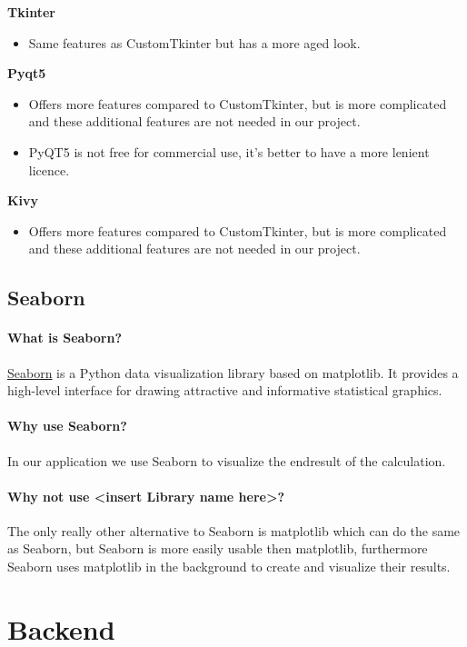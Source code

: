 \documentclass[parskip=full]{report} %
\begin{document}
\textbf{Tkinter}
\begin{itemize}
    \item Same features as CustomTkinter but has a more aged look.
\end{itemize}
  
\textbf{Pyqt5}
\begin{itemize}
    \item Offers more features compared to CustomTkinter, but is more complicated and these additional features are not needed in our project.
    \item PyQT5 is not free for commercial use, it's better to have a more lenient licence.
\end{itemize}
\textbf{Kivy}
\begin{itemize}
    \item Offers more features compared to CustomTkinter, but is more complicated and these additional features are not needed in our project. 
\end{itemize}


\subsection{Seaborn}
\paragraph{What is Seaborn?}
\href{https://seaborn.pydata.org/}{Seaborn} is a Python data visualization library based on matplotlib. It provides a high-level interface for drawing attractive and informative statistical graphics.

\paragraph{Why use Seaborn?}
In our application we use Seaborn to visualize the endresult of the calculation.

\paragraph{Why not use <insert Library name here>?}
The only really other alternative to Seaborn is matplotlib which can do the same as Seaborn, but Seaborn is more easily usable then matplotlib, furthermore Seaborn uses matplotlib in the background to create and visualize their results.




\section{Backend}
\end{document}
